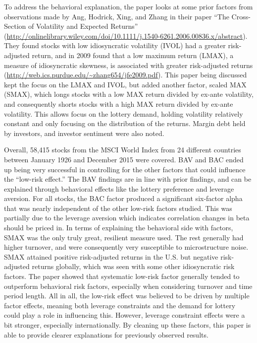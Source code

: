 \documentclass[12pt,twoside]{reedthesis}
\theoremstyle{definition}
\theoremstyle{definition}
\theoremstyle{definition}
\theoremstyle{remark}
\begin{document}
To address the behavioral explanation, the paper looks at some prior
factors from observations made by Ang, Hodrick, Xing, and Zhang in their
paper ``The Cross-Section of Volatility and Expected Returns''
(\url{http://onlinelibrary.wiley.com/doi/10.1111/j.1540-6261.2006.00836.x/abstract}).
They found stocks with low idiosyncratic volatility (IVOL) had a greater
risk-adjusted return, and in 2009 found that a low maximum return
(LMAX), a measure of idiosyncratic skewness, is associated with greater
risk-adjusted returns
(\url{http://web.ics.purdue.edu/~zhang654/jfe2009.pdf}). This paper
being discussed kept the focus on the LMAX and IVOL, but added another
factor, scaled MAX (SMAX), which longs stocks with a low MAX return
divided by ex-ante volatility, and consequently shorts stocks with a
high MAX return divided by ex-ante volatility. This allows focus on the
lottery demand, holding volatility relatively constant and only focusing
on the distribution of the returns. Margin debt held by investors, and
investor sentiment were also noted.

Overall, 58,415 stocks from the MSCI World Index from 24 different
countries between January 1926 and December 2015 were covered. BAV and
BAC ended up being very successful in controlling for the other factors
that could influence the ``low-risk effect.'' The BAV findings are in
line with prior findings, and can be explained through behavioral
effects like the lottery preference and leverage aversion. For all
stocks, the BAC factor produced a significant six-factor alpha that was
nearly independent of the other low-risk factors studied. This was
partially due to the leverage aversion which indicates correlation
changes in beta should be priced in. In terms of explaining the
behavioral side with factors, SMAX was the only truly great, resilient
measure used. The rest generally had higher turnover, and were
consequently very susceptible to microstructure noise. SMAX attained
positive risk-adjusted returns in the U.S. but negative risk-adjusted
returns globally, which was seen with some other idiosyncratic risk
factors. The paper showed that systematic low-risk factor generally
tended to outperform behavioral risk factors, especially when
considering turnover and time period length. All in all, the low-risk
effect was believed to be driven by multiple factor effects, meaning
both leverage constraints and the demand for lottery could play a role
in influencing this. However, leverage constraint effects were a bit
stronger, especially internationally. By cleaning up these factors, this
paper is able to provide clearer explanations for previously observed
results.
\end{document}
